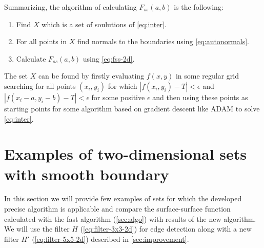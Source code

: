 \documentclass[reprint,amsmath,amssymb,aps,pre,showkeys,showpacs]{revtex4-1}
\begin{document}
Summarizing, the algorithm of calculating $F_{ss}(a, b)$ is the following:
\begin{enumerate}
\item Find $X$ which is a set of soulutions of \cref{eq:inter}.
\item For all points in $X$ find normals to the boundaries using
  \cref{eq:autonormals}.
\item Calculate $F_{ss}(a, b)$ using \cref{eq:fss-2d}.
\end{enumerate}

The set $X$ can be found by firstly evaluating $f(x, y)$ in some regular grid
searching for all points $(x_i, y_i)$ for which $|f(x_i, y_i) - T| < \epsilon$
and $|f(x_i - a, y_i - b) - T| < \epsilon$ for some positive $\epsilon$
and then using these points as starting points for some algorithm based on
gradient descent like ADAM to solve \cref{eq:inter}.

\section{Examples of two-dimensional sets with smooth boundary}
\label{seq:examples}
In this section we will provide few examples of sets for which the developed
precise algorithm is applicable and compare the surface-surface function
calculated with the fast algorithm (\cref{sec:algo}) with results of the new
algorithm. We will use the filter $H$ (\ref{eq:filter-3x3-2d}) for edge
detection along with a new filter $H'$ (\ref{eq:filter-5x5-2d}) described in
\cref{sec:improvement}.
\end{document}
